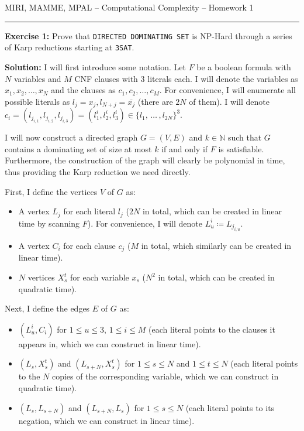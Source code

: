 \documentclass{amsart}
\theoremstyle{plain}
\theoremstyle{definition}
\newcommand{\N}{\mathbb{N}}
\begin{document}
    {\Large MIRI, MAMME, MPAL -- Computational Complexity -- Homework 1}

    \vspace{0.5cm}

    \hrule

    \vspace{0.5cm}

    \textbf{Exercise 1:} Prove that \verb|DIRECTED DOMINATING SET| is NP-Hard through a series of Karp reductions
    starting at \verb|3SAT|.

    \textbf{Solution:} I will first introduce some notation.
    Let $F$ be a boolean formula with $N$ variables and $M$ CNF
    clauses with $3$ literals each.
    I will denote the variables as $x_1, x_2, \ldots, x_N$ and the clauses as $c_1, c_2, \ldots, c_M$.
    For convenience, I will enumerate all possible literals as $l_j = x_j, l_{N+j} = \overline{x_j}$
    (there are $2N$ of them).
    I will denote
    $c_i = \left( l_{j_{i, 1}}, l_{j_{i, 2}}, l_{j_{i, 3}} \right) =
    \left( l^i_1, l^i_2, l^i_3 \right)
    \in \{l_1, \, \dots \, , l_{2N}\}^3$.

    I will now construct a directed graph $G = (V, E)$ and $k \in \N$ such that
    $G$ contains a dominating set of size at most $k$ if and only if $F$ is satisfiable.
    Furthermore, the construction of the graph will clearly be polynomial in time,
    thus providing the Karp reduction we need directly.

    First, I define the vertices $V$ of $G$ as:
    \begin{itemize}
        \item A vertex $L_j$ for each literal $l_j$ ($2N$ in total, which can be created in linear time by scanning $F$).
        For convenience, I will denote $L^i_u \coloneqq L_{j_{i, u}}$.

        \item A vertex $C_i$ for each clause $c_j$ ($M$ in total, which similarly can be created in linear time).

        \item $N$ vertices $X_s^t$ for each variable $x_s$ ($N^2$ in total, which can be created in quadratic time).
    \end{itemize}

    Next, I define the edges $E$ of $G$ as:
    \begin{itemize}
        \item $\left( L^i_u, C_i \right)$ for $1 \leq u \leq 3,\, 1 \leq i \leq M$
        (each literal points to the clauses it appears in, which we can construct in linear time).

        \item $\left(L_s, X^t_s \right)$ and $\left(L_{s + N}, X^t_s \right)$ for
        $1 \leq s \leq N$ and $1 \leq t \leq N$
        (each literal points to the $N$ copies of the corresponding variable,
        which we can construct in quadratic time).

        \item $\left( L_s, L_{s+N} \right)$ and $\left( L_{s+N}, L_{s} \right)$ for $1 \leq s \leq N$
        (each literal points to its negation, which we can construct in linear time).
    \end{itemize}
\end{document}
